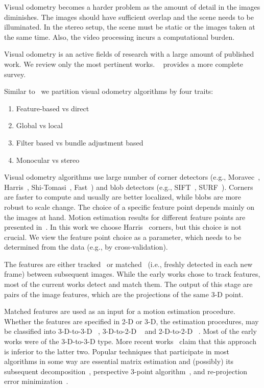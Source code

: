 \documentclass{bmvc2k}
\begin{document}
Visual odometry becomes a harder problem as the amount of detail in
the images diminishes. The images should have sufficient overlap and
the scene needs to be illuminated.  In the stereo setup, the scene
must be static or the images taken at the same time. Also, the video
processing incurs a computational burden.

Visual odometry is an active fields of research with a large amount of
published work.  We review only the most pertinent works.
~\cite{Scaramuzza2011} provides a more complete survey.

Similar to~\cite{Persson2015} we partition visual odometry algorithms
by four traits:
\begin{enumerate}
\item Feature-based vs direct
\item Global vs local
\item Filter based vs bundle adjustment based
\item Monocular vs stereo
\end{enumerate}

Visual odometry algorithms use large number of corner detectors
(e.g., Moravec~\cite{Moravec1980}, Harris~\cite{Harris1987},
Shi-Tomasi~\cite{Shi1994}, Fast~\cite{Rosten2006}) and blob detectors
(e.g., SIFT~\cite{Lowe2004}, SURF~\cite{Bay2006}). Corners are faster to
compute and usually are better localized, while blobs are more robust
to scale change. The choice of a specific feature point depends mainly
on the images at hand.  Motion estimation results for different
feature points are presented in~\cite{Govender2009}. In this work we
choose Harris~\cite{Harris1987} corners, but this choice is not
crucial. We view the feature point choice as a parameter, which needs
to be determined from the data (e.g., by cross-validation).

The features are either tracked~\cite{Hedborg2009} or
matched~\cite{Geiger2011} (i.e., freshly detected in each new frame)
between subsequent images. While the early works chose to track
features, most of the current works detect and match them. The output
of this stage are pairs of the image features, which are the
projections of the same 3-D point.

Matched features are used as an input for a motion estimation
procedure.  Whether the features are specified in 2-D or 3-D, the
estimation procedures, may be classified into 3-D-to-3-D
~\cite{Milella2006}, 3-D-to-2-D ~\cite{Geiger2011} and 2-D-to-2-D
~\cite{Nister2004}. Most of the early works were of the 3-D-to-3-D
type.  More recent works~\cite{Nister2004} claim that this approach is
inferior to the latter two. Popular techniques that participate in
most algorithms in some way are essential matrix estimation and
(possibly) its subsequent decomposition~\cite{Nister2004}, perspective
3-point algorithm~\cite{Kneip1991}, and re-projection error
minimization~\cite{Geiger2011}.
\end{document}
